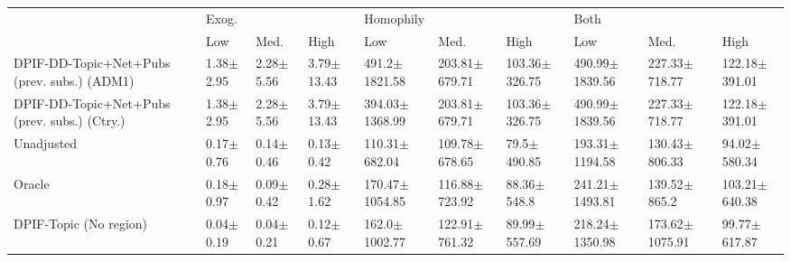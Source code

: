 \begin{tabular}{llllllllll}
\toprule
{} & \multicolumn{3}{l}{Exog.} & \multicolumn{3}{l}{Homophily} & \multicolumn{3}{l}{Both} \\
{} &            Low &           Med. &            High &                 Low &               Med. &               High &                 Low &                Med. &               High \\
\midrule
DPIF-DD-Topic+Net+Pubs (prev. subs.) (ADM1)  &  1.38$\pm$2.95 &  2.28$\pm$5.56 &  3.79$\pm$13.43 &   491.2$\pm$1821.58 &  203.81$\pm$679.71 &  103.36$\pm$326.75 &  490.99$\pm$1839.56 &   227.33$\pm$718.77 &  122.18$\pm$391.01 \\
DPIF-DD-Topic+Net+Pubs (prev. subs.) (Ctry.) &  1.38$\pm$2.95 &  2.28$\pm$5.56 &  3.79$\pm$13.43 &  394.03$\pm$1368.99 &  203.81$\pm$679.71 &  103.36$\pm$326.75 &  490.99$\pm$1839.56 &   227.33$\pm$718.77 &  122.18$\pm$391.01 \\
Unadjusted                                   &  0.17$\pm$0.76 &  0.14$\pm$0.46 &   0.13$\pm$0.42 &   110.31$\pm$682.04 &  109.78$\pm$678.65 &    79.5$\pm$490.85 &  193.31$\pm$1194.58 &   130.43$\pm$806.33 &   94.02$\pm$580.34 \\
Oracle                                       &  0.18$\pm$0.97 &  0.09$\pm$0.42 &   0.28$\pm$1.62 &  170.47$\pm$1054.85 &  116.88$\pm$723.92 &    88.36$\pm$548.8 &  241.21$\pm$1493.81 &    139.52$\pm$865.2 &  103.21$\pm$640.38 \\
DPIF-Topic (No region)                       &  0.04$\pm$0.19 &  0.04$\pm$0.21 &   0.12$\pm$0.67 &   162.0$\pm$1002.77 &  122.91$\pm$761.32 &   89.99$\pm$557.69 &  218.24$\pm$1350.98 &  173.62$\pm$1075.91 &   99.77$\pm$617.87 \\
\bottomrule
\end{tabular}
